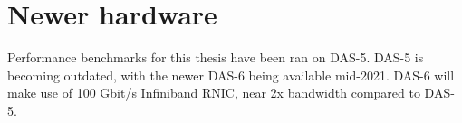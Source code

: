 \section{Newer hardware}
Performance benchmarks for this thesis have been ran on DAS-5.
DAS-5 is becoming outdated, with the newer DAS-6 being available mid-2021\cite{das6}.
DAS-6 will make use of 100 Gbit/s Infiniband RNIC, near 2x bandwidth compared to DAS-5.


